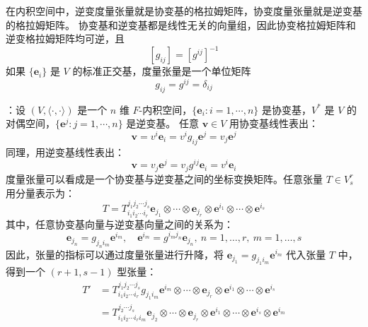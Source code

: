\begin{note}
    在内积空间中，逆变度量张量就是协变基的格拉姆矩阵，协变度量张量就是逆变基的格拉姆矩阵。
    协变基和逆变基都是线性无关的向量组，因此协变格拉姆矩阵和逆变格拉姆矩阵均可逆，且
    \[
        [g_{ij}] = [g^{ij}]^{-1}
    \]
    如果 $\{\mathbf{e}_i\}$ 是 $V$ 的标准正交基，度量张量是一个单位矩阵
    \[
        g_{ij} = g^{ij} = \delta_{ij}
    \]
\end{note}


\vspace{1em}

\begin{example}[指标升降]
\textbf{}：设 $(V,\langle \cdot,\cdot\rangle)$ 是一个 $n$ 维 $F$-内积空间，$\{\mathbf{e}_i:i=1,\cdots,n\}$ 是协变基，$V^*$ 是 $V$ 的对偶空间，$\{\mathbf{e}^j:j=1,\cdots,n\}$ 是逆变基。
任意 $\mathbf{v}\in V$ 用协变基线性表出：
\[
    \mathbf{v} = v^i\mathbf{e}_i = v^i g_{ij} \mathbf{e}^j = v_j \mathbf{e}^j
\]
同理，用逆变基线性表出：
\[
    \mathbf{v} = v_j \mathbf{e}^j = v_j g^{ij} \mathbf{e}_i = v^i \mathbf{e}_i
\]
度量张量可以看成是一个协变基与逆变基之间的坐标变换矩阵。任意张量 $T\in V^r_s$ 用分量表示为：
\[
    T = T_{i_1 i_2 \cdots i_r}^{j_1 j_2 \cdots j_s} 
    \mathbf{e}_{j_1} \otimes \cdots \otimes \mathbf{e}_{j_r} \otimes \mathbf{e}^{i_1} \otimes \cdots \otimes \mathbf{e}^{i_s}
\]
其中，任意协变基向量与逆变基向量之间的关系为：
\[
    \mathbf{e}_{j_n} = g_{j_n i_m} \mathbf{e}^{i_m},\quad \mathbf{e}^{i_m} = g^{i_m j_n} \mathbf{e}_{j_n},\ n=1,\ldots,r,\ m=1,\ldots,s
\]
因此，张量的指标可以通过度量张量进行升降，将 $\mathbf{e}_{j_1} = g_{j_1 i_m} \mathbf{e}^{i_m}$ 代入张量 $T$ 中，得到一个 $(r+1,s-1)$ 型张量：
\begin{align*}
    T' &= T_{i_1 i_2 \cdots i_r}^{j_1 j_2 \cdots j_s} 
    g_{j_1 i_m} \mathbf{e}^{i_m} \otimes \cdots \otimes \mathbf{e}_{j_r} \otimes \mathbf{e}^{i_1} \otimes \cdots \otimes \mathbf{e}^{i_s}\\
    &= T_{i_1 i_2 \cdots i_r i_m}^{j_2 \cdots j_s} \mathbf{e}_{j_2} \otimes \cdots \otimes \mathbf{e}_{j_r} \otimes \mathbf{e}^{i_1} \otimes \cdots \otimes \mathbf{e}^{i_s} \otimes \mathbf{e}^{i_m}
\end{align*}
\end{example}

\vspace{1em}

